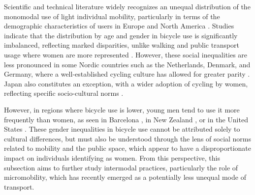 \begin{refsegment}
Scientific and technical literature widely recognizes an unequal distribution of the monomodal use of light individual mobility, particularly in terms of the demographic characteristics of users in Europe and North America \textcolor{blue}{\autocites[101]{handy_factors_2011}[8]{codina_built_2022}}. Studies indicate that the distribution by age and gender in bicycle use is significantly imbalanced, reflecting marked disparities, unlike walking and public transport usage where women are more represented \textcolor{blue}{\autocite[5-7]{pollard_gender_2017}}. However, these social inequalities are less pronounced in some Nordic countries such as the Netherlands, Denmark, and Germany, where a well-established cycling culture has allowed for greater parity \textcolor{blue}{\autocites[81]{nelson_if_1997}[505]{pucher_making_2008}}. Japan also constitutes an exception, with a wider adoption of cycling by women, reflecting specific socio-cultural norms \textcolor{blue}{\autocite[21-22]{lagadic_cycling_2022}}.%

However, in regions where bicycle use is lower, young men tend to use it more frequently than women, as seen in Barcelona \textcolor{blue}{\autocite[7]{codina_built_2022}}, in New Zealand \textcolor{blue}{\autocite[6]{shaw_beyond_2020}}, or in the United States \textcolor{blue}{\autocite[513]{garrard_women_2012}}. These gender inequalities in bicycle use cannot be attributed solely to cultural differences, but must also be understood through the lens of social norms related to mobility and the \gls{public space}, which appear to have a disproportionate impact on individuals identifying as women. From this perspective, this subsection aims to further study intermodal practices, particularly the role of micromobility, which has recently emerged as a potentially less unequal mode of transport.%


\end{refsegment}
